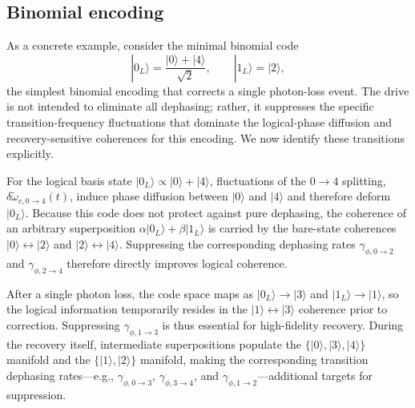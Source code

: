 \subsection{Binomial encoding}
As a concrete example, consider the minimal binomial code \cite{Michael2016}
\begin{equation}
|0_L\rangle=\frac{|0\rangle+|4\rangle}{\sqrt{2}},\qquad |1_L\rangle=|2\rangle,
\end{equation}
the simplest binomial encoding that corrects a single photon-loss event. The drive is not intended to eliminate all dephasing; rather, it suppresses the specific transition-frequency fluctuations that dominate the logical-phase diffusion and recovery-sensitive coherences for this encoding. We now identify these transitions explicitly.

For the logical basis state \( |0_L\rangle \propto |0\rangle + |4\rangle \), fluctuations of the \(0\!\rightarrow\!4\) splitting, \( \delta\widetilde{\omega}_{c,0\rightarrow 4}(t) \), induce phase diffusion between \( |0\rangle \) and \( |4\rangle \) and therefore deform \( |0_L\rangle \).
Because this code does not protect against pure dephasing, the coherence of an arbitrary superposition \( \alpha|0_L\rangle + \beta|1_L\rangle \) is carried by the bare-state coherences \( |0\rangle\!\leftrightarrow\!|2\rangle \) and \( |2\rangle\!\leftrightarrow\!|4\rangle \). Suppressing the corresponding dephasing rates \(\gamma_{\phi,0\rightarrow 2}\) and \(\gamma_{\phi,2\rightarrow 4}\) therefore directly improves logical coherence.

After a single photon loss, the code space maps as \( |0_L\rangle \rightarrow |3\rangle \) and \( |1_L\rangle \rightarrow |1\rangle \), so the logical information temporarily resides in the \( |1\rangle\!\leftrightarrow\!|3\rangle \) coherence prior to correction. Suppressing \(\gamma_{\phi,1\rightarrow 3}\) is thus essential for high-fidelity recovery. During the recovery itself, intermediate superpositions populate the \(\{|0\rangle,|3\rangle,|4\rangle\}\) manifold and the \(\{|1\rangle,|2\rangle\}\) manifold, making the corresponding transition dephasing rates---e.g., \(\gamma_{\phi,0\rightarrow 3}\), \(\gamma_{\phi,3\rightarrow 4}\), and \(\gamma_{\phi,1\rightarrow 2}\)---additional targets for suppression.

